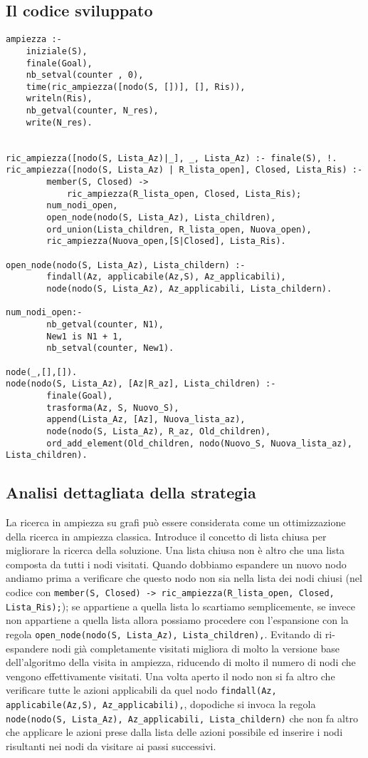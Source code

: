 \subsection{Il codice sviluppato}

\begin{lstlisting}
ampiezza :-
    iniziale(S),
    finale(Goal),
    nb_setval(counter , 0),
    time(ric_ampiezza([nodo(S, [])], [], Ris)),
    writeln(Ris),
    nb_getval(counter, N_res),
    write(N_res).


ric_ampiezza([nodo(S, Lista_Az)|_], _, Lista_Az) :- finale(S), !.
ric_ampiezza([nodo(S, Lista_Az) | R_lista_open], Closed, Lista_Ris) :-
        member(S, Closed) ->
        	ric_ampiezza(R_lista_open, Closed, Lista_Ris);
        num_nodi_open,
        open_node(nodo(S, Lista_Az), Lista_children),
        ord_union(Lista_children, R_lista_open, Nuova_open),
        ric_ampiezza(Nuova_open,[S|Closed], Lista_Ris).

open_node(nodo(S, Lista_Az), Lista_childern) :-
        findall(Az, applicabile(Az,S), Az_applicabili),
        node(nodo(S, Lista_Az), Az_applicabili, Lista_childern).

num_nodi_open:-
        nb_getval(counter, N1),
        New1 is N1 + 1,
        nb_setval(counter, New1).

node(_,[],[]).
node(nodo(S, Lista_Az), [Az|R_az], Lista_children) :-
        finale(Goal),
        trasforma(Az, S, Nuovo_S),
        append(Lista_Az, [Az], Nuova_lista_az),
        node(nodo(S, Lista_Az), R_az, Old_children),
        ord_add_element(Old_children, nodo(Nuovo_S, Nuova_lista_az), Lista_children).
\end{lstlisting}

\subsection{Analisi dettagliata della strategia}

La ricerca in ampiezza su grafi può essere considerata come un ottimizzazione della ricerca in ampiezza classica. Introduce il concetto di lista chiusa per migliorare la ricerca della soluzione. Una lista chiusa non è altro che una lista composta da tutti i nodi visitati. Quando
dobbiamo espandere un nuovo nodo andiamo prima a verificare che questo nodo non sia nella lista dei nodi chiusi (nel codice con \lstinline{member(S, Closed) -> ric_ampiezza(R_lista_open, Closed, Lista_Ris);}); se appartiene a quella lista lo scartiamo semplicemente, se invece non appartiene a quella lista allora possiamo procedere con l'espansione con la regola  \lstinline{open_node(nodo(S, Lista_Az), Lista_children),}.
Evitando di ri-espandere nodi già completamente visitati migliora di molto la versione base dell'algoritmo della visita in ampiezza, riducendo di molto il numero di nodi che vengono effettivamente visitati. Una volta aperto il nodo non si fa altro che verificare tutte le azioni applicabili da quel nodo \lstinline{findall(Az, applicabile(Az,S), Az_applicabili),}, dopodiche si invoca la regola \lstinline{node(nodo(S, Lista_Az), Az_applicabili, Lista_childern)} che non fa altro che applicare le azioni prese dalla lista delle azioni possibile ed inserire i nodi risultanti nei nodi da visitare ai passi successivi.

